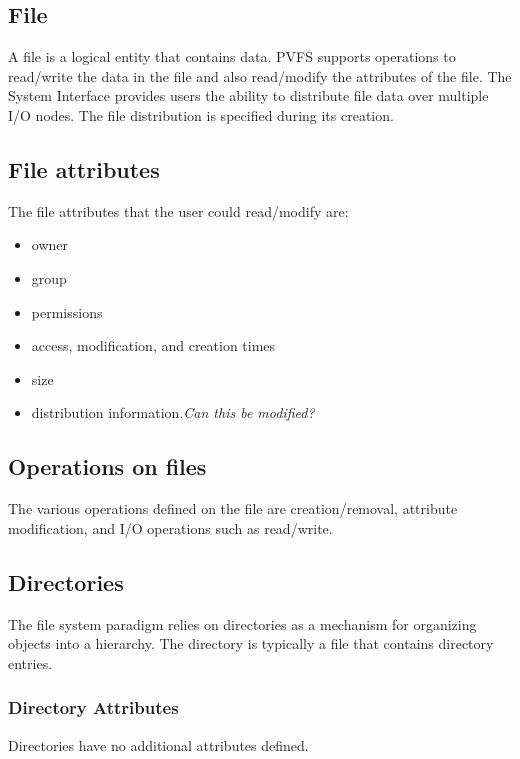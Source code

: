 \documentclass[11pt, letterpaper]{article}
\begin{document}
%
%
\subsection{File}

A file is a logical entity that contains data. PVFS supports operations
to read/write the data in the file and also read/modify the attributes of
the file. The System Interface provides users the ability to distribute
file data over multiple I/O nodes. The file distribution is specified
during its creation.

\subsection{File attributes}
The file attributes that the user could read/modify are:

\begin{itemize}
\item owner
\item group
\item permissions
\item access, modification, and creation times
\item size
\item distribution information.\emph{Can this be modified?}
\end{itemize}

\subsection{Operations on files}

The various operations defined on the file are creation/removal,
attribute modification, and I/O operations such as read/write.

%
%
\subsection{Directories}

The file system paradigm relies on directories as a mechanism for
organizing objects into a hierarchy. The directory is typically a file
that contains directory entries.

\subsubsection{Directory Attributes}

Directories have no additional attributes defined.
\end{document}
